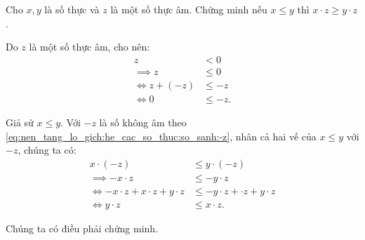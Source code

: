 \exercise Cho $x, y$ là số thực và $z$ là một số thực âm. Chứng minh nếu $x \leq y$ thì $x\cdot z \geq y\cdot z$.

\solution

Do $z$ là một số thực âm, cho nên:
\begin{align}
   z &< 0 \nonumber\\
   \implies z &\leq 0 \nonumber\\
   \iff z + (-z) &\leq -z \nonumber\\
   \iff 0 &\leq -z. \label{eq:nen_tang_lo_gich:he_cac_so_thuc:so_sanh:-z}
\end{align}

Giả sử $x \leq y$. Với $-z$ là số không âm theo \eqref{eq:nen_tang_lo_gich:he_cac_so_thuc:so_sanh:-z}, nhân cả hai vế của $x \leq y$ với $-z$, chúng ta có:
\begin{align*}
   x\cdot (-z) &\leq y\cdot(-z) \\
   \implies -x \cdot z &\leq -y\cdot z \\
   \iff -x \cdot z + x\cdot z + y \cdot z &\leq -y\cdot z + \cdot z + y \cdot z \\
   \iff y \cdot z &\leq x \cdot z.
\end{align*}

Chúng ta có điều phải chứng minh.
